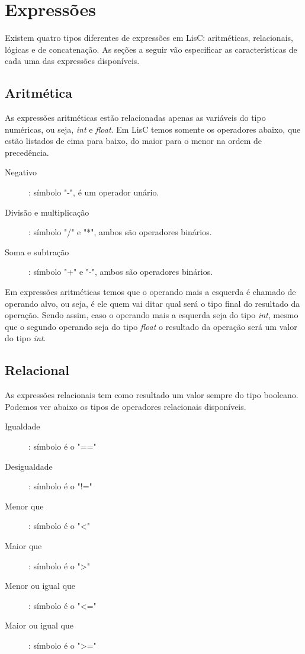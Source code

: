 \documentclass[
  12pt,				%
  oneside,			%
  a4paper,			%
  english,			%
  french,				%
  spanish,			%
  brazil,				%
]{abntex2}
\begin{document}
\section{Expressões}
\label{sec:expressoes}

Existem quatro tipos diferentes de expressões em LisC: aritméticas,
relacionais, lógicas e de concatenação. As seções a seguir vão especificar as
características de cada uma das expressões disponíveis.

\subsection{Aritmética}
\label{subsec:aritmeticas}

As expressões aritméticas estão relacionadas apenas as variáveis do tipo numéricas,
ou seja, \emph{int} e \emph{float}. Em LisC temos somente os
operadores abaixo, que estão listados de cima para baixo, do maior
para o menor na ordem de precedência.

\begin{description}
\item [Negativo]: símbolo "-", é um operador unário.
\item [Divisão e multiplicação]: símbolo "/" e "*", ambos são
  operadores binários.
\item [Soma e subtração]: símbolo "+" e "-", ambos são operadores binários.
\end{description}

Em expressões aritméticas temos que o operando mais a esquerda é
chamado de operando alvo, ou seja, é ele quem vai ditar qual será o
tipo final do resultado da operação. Sendo assim, caso o operando mais
a esquerda seja do tipo \emph{int}, mesmo que o segundo operando seja
do tipo \emph{float} o resultado da operação será um valor do tipo \emph{int}.

\subsection{Relacional}
\label{subsec:relacionais}

As expressões relacionais tem como resultado um valor sempre do tipo
booleano. Podemos ver abaixo os tipos de operadores relacionais
disponíveis.

\begin{description}
\item [Igualdade]: símbolo é o "=="
\item [Desigualdade]: símbolo é o "!="
\item [Menor que]: símbolo é o "<"
\item [Maior que]: símbolo é o ">"
\item [Menor ou igual que]: símbolo é o "<="
\item [Maior ou igual que]: símbolo é o ">="
\end{description}
\end{document}
